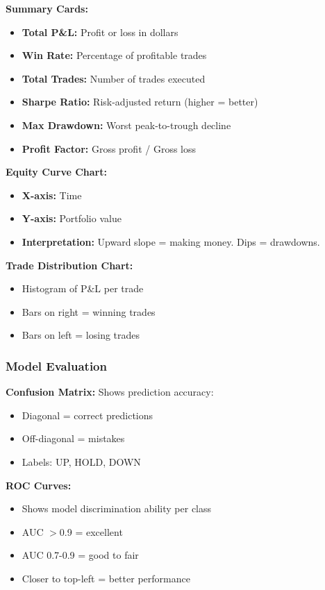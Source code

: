 \documentclass[12pt,a4paper]{article}
\begin{document}
\textbf{Summary Cards:}
\begin{itemize}
    \item \textbf{Total P\&L:} Profit or loss in dollars
    \item \textbf{Win Rate:} Percentage of profitable trades
    \item \textbf{Total Trades:} Number of trades executed
    \item \textbf{Sharpe Ratio:} Risk-adjusted return (higher = better)
    \item \textbf{Max Drawdown:} Worst peak-to-trough decline
    \item \textbf{Profit Factor:} Gross profit / Gross loss
\end{itemize}

\textbf{Equity Curve Chart:}
\begin{itemize}
    \item \textbf{X-axis:} Time
    \item \textbf{Y-axis:} Portfolio value
    \item \textbf{Interpretation:} Upward slope = making money. Dips = drawdowns.
\end{itemize}

\textbf{Trade Distribution Chart:}
\begin{itemize}
    \item Histogram of P\&L per trade
    \item Bars on right = winning trades
    \item Bars on left = losing trades
\end{itemize}

\subsubsection{Model Evaluation}
\textbf{Confusion Matrix:}
Shows prediction accuracy:
\begin{itemize}
    \item Diagonal = correct predictions
    \item Off-diagonal = mistakes
    \item Labels: UP, HOLD, DOWN
\end{itemize}

\textbf{ROC Curves:}
\begin{itemize}
    \item Shows model discrimination ability per class
    \item AUC $>$0.9 = excellent
    \item AUC 0.7-0.9 = good to fair
    \item Closer to top-left = better performance
\end{itemize}
\end{document}
